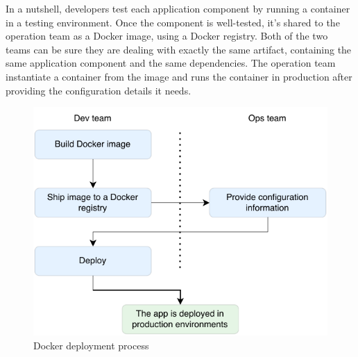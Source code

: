 In a nutshell, developers test each application component by running a container in a testing environment. Once the component is well-tested, it's shared to the operation team as a Docker image, using a Docker registry. Both of the two teams can be sure they are dealing with exactly the same artifact, containing the same application component and the same dependencies.
The operation team instantiate a container from the image and runs the container in production after providing the configuration details it needs.

\begin{figure}[htbp]
    \vspace{10pt}
    \centering
    \includegraphics[width=1\textwidth]{assets/deployment_docker.pdf}
    \caption{Docker deployment process}
    \label{fig:docker_deployment}
    \vspace{10pt}
\end{figure}

